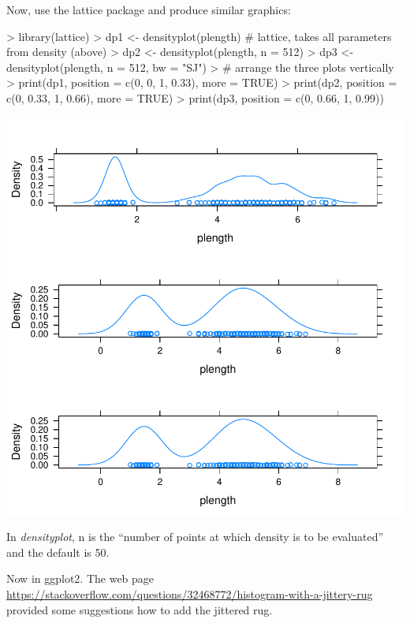 \documentclass[12pt,letterpaper,final]{article}
\begin{document}
Now, use the lattice package and produce similar graphics:
\begin{Schunk}
\begin{Sinput}
> library(lattice)
> dp1 <- densityplot(plength)  # lattice, takes all parameters from density (above)
> dp2 <- densityplot(plength, n = 512)
> dp3 <- densityplot(plength, n = 512, bw = "SJ")
> # arrange the three plots vertically
> print(dp1, position = c(0, 0, 1, 0.33), more = TRUE)
> print(dp2, position = c(0, 0.33, 1, 0.66), more = TRUE)
> print(dp3, position = c(0, 0.66, 1, 0.99))
\end{Sinput}
\end{Schunk}
\includegraphics{lect_main-029}

In {\it densityplot}, n is the ``number of points at which density is to be evaluated''
and the default is 50.


Now in ggplot2. The web page 
\url{https://stackoverflow.com/questions/32468772/histogram-with-a-jittery-rug}
provided some suggestions how to add the jittered rug.
\end{document}
